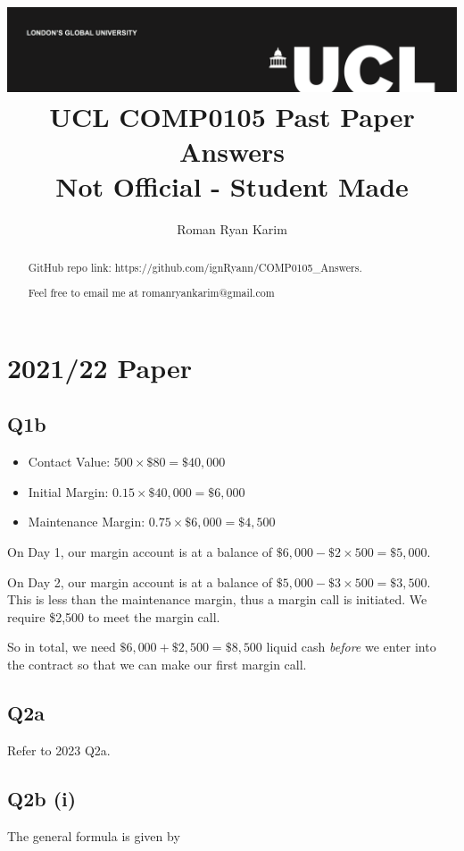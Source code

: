 \documentclass[a4paper]{article}[10pt]
\title{{\vspace{-4em} \includegraphics[scale=0.4]{ucl_logo.png}}\\
{{\vspace{2em} \Huge UCL COMP0105 Past Paper Answers}}\\
{\Large Not Official - Student Made}\\
}
\author{Roman Ryan Karim}
\begin{document}
 
\onehalfspacing
\maketitle
\setcounter{page}{1}

\begin{abstract}
	GitHub repo link: https://github.com/ignRyann/COMP0105\_Answers. 
	
	Feel free to email me at romanryankarim@gmail.com
\end{abstract}


\newpage
\tableofcontents
\newpage

\section{2021/22 Paper}
\subsection*{Q1b}

\begin{itemize}
	\item Contact Value: $500 \times \$80 = \$40,000$
	\item Initial Margin: $0.15 \times \$40,000 = \$6,000$
	\item Maintenance Margin: $0.75 \times \$6,000 = \$4,500$
\end{itemize}

On Day 1, our margin account is at a balance of $\$6,000 - \$2 \times 500 = \$5,000$.

On Day 2, our margin account is at a balance of $\$5,000 - \$3 \times 500 = \$3,500$. This is less than the maintenance margin, thus a margin call is initiated. We require \$2,500 to meet the margin call.

So in total, we need $\$6,000 + \$2,500 = \$8,500$ liquid cash \textit{before} we enter into the contract so that we can make our first margin call.

\subsection*{Q2a}
Refer to 2023 Q2a.

\subsection*{Q2b (i)}
The general formula is given by
\end{document}
